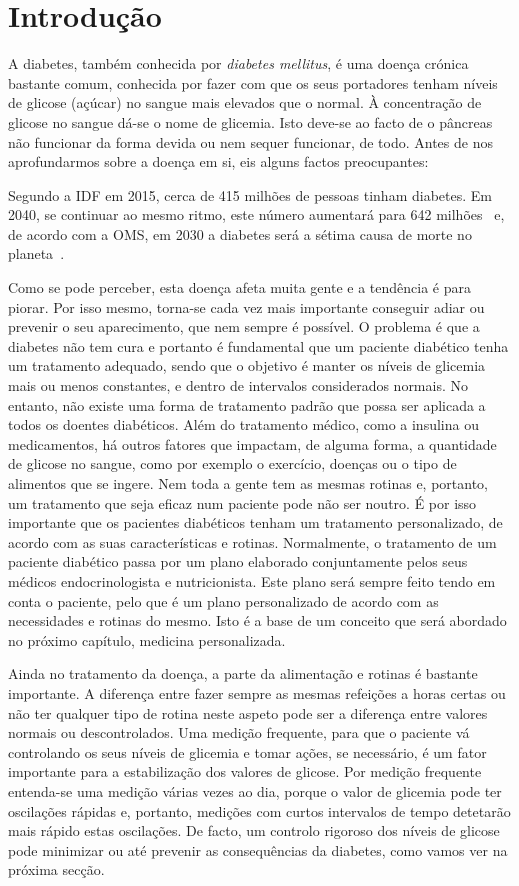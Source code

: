 \chapter{Introdução}\label{chap:intro}


A diabetes, também conhecida por \textit{diabetes mellitus}, é uma doença crónica bastante comum, conhecida por fazer com que os seus portadores tenham níveis de glicose (açúcar) no sangue mais elevados que o normal. À concentração de glicose no sangue dá-se o nome de glicemia. Isto deve-se ao facto de o pâncreas não funcionar da forma devida ou nem sequer funcionar, de todo. Antes de nos aprofundarmos sobre a doença em si, eis alguns factos preocupantes:

Segundo a \ac{IDF} em 2015, cerca de 415 milhões de pessoas tinham diabetes. Em 2040, se continuar ao mesmo ritmo, este número aumentará para 642 milhões~\cite{atlas} e, de acordo com a \ac{OMS}, em 2030 a diabetes será a sétima causa de morte no planeta~\cite{who}.

Como se pode perceber, esta doença afeta muita gente e a tendência é para piorar. Por isso mesmo, torna-se cada vez mais importante conseguir adiar ou prevenir o seu aparecimento, que nem sempre é possível. O problema é que a diabetes não tem cura e portanto é fundamental que um paciente diabético tenha um tratamento adequado, sendo que o objetivo é manter os níveis de glicemia mais ou menos constantes, e dentro de intervalos considerados normais.
No entanto, não existe uma forma de tratamento padrão que possa ser aplicada a todos os doentes diabéticos. Além do tratamento médico, como a insulina ou medicamentos, há outros fatores que impactam, de alguma forma, a quantidade de glicose no sangue, como por exemplo o exercício, doenças ou o tipo de alimentos que se ingere. 
Nem toda a gente tem as mesmas rotinas e, portanto, um tratamento que seja eficaz num paciente pode não ser noutro. É por isso importante que os pacientes diabéticos tenham um tratamento personalizado, de acordo com as suas características e rotinas. Normalmente, o tratamento de um paciente diabético passa por um plano elaborado conjuntamente pelos seus médicos endocrinologista e nutricionista. Este plano será sempre feito tendo em conta o paciente, pelo que é um plano personalizado de acordo com as necessidades e rotinas do mesmo. Isto é a base de um conceito que será abordado no próximo capítulo, medicina personalizada.

Ainda no tratamento da doença, a parte da alimentação e rotinas é bastante importante. A diferença entre fazer sempre as mesmas refeições a horas certas ou não ter qualquer tipo de rotina neste aspeto pode ser a diferença entre valores normais ou descontrolados. Uma medição frequente, para que o paciente vá controlando os seus níveis de glicemia e tomar ações, se necessário, é um fator importante para a estabilização dos valores de glicose. Por medição frequente entenda-se uma medição várias vezes ao dia, porque o valor de glicemia pode ter oscilações rápidas e, portanto, medições com curtos intervalos de tempo detetarão mais rápido estas oscilações.
De facto, um controlo rigoroso dos níveis de glicose pode minimizar ou até prevenir as consequências da diabetes, como vamos ver na próxima secção.



